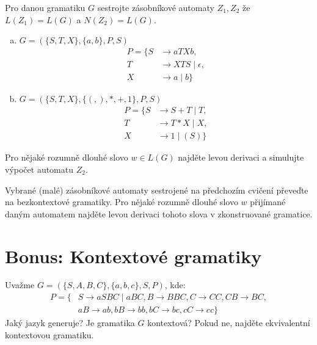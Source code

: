 \documentclass[a4paper,12pt]{amsart}
\begin{document}
\medskip\begin{problem}

    Pro danou gramatiku $G$ sestrojte zásobníkové automaty $Z_1,Z_2$ že $L(Z_1)=L(G)$ a $N(Z_2)=L(G)$.

    \medskip

    \begin{enumerate}[(a)]\setlength\itemsep{6pt}
        \item $G=(\{S,T,X\},\{a,b\},P,S)$
            \begin{align*}
        P=\{S&\rightarrow aTXb, \\
        T&\rightarrow XTS\mid \epsilon,\\ 
        X&\rightarrow a\mid b\}
        \end{align*}
        \item $G=(\{S,T,X\},\{(,),*,+,1\},P,S)$
            \begin{align*}
        P=\{S&\rightarrow S+T\mid T, \\
        T&\rightarrow T*X\mid X,\\ 
        X&\rightarrow 1\mid (S)\}
        \end{align*}
    \end{enumerate}

    Pro nějaké rozumně dlouhé slovo $w\in L(G)$ najděte levou derivaci a simulujte výpočet automatu $Z_2$.

\end{problem}
    

\medskip\begin{problem}

    Vybrané (malé) zásobníkové automaty sestrojené na předchozím cvičení převeďte na bezkontextové gramatiky. Pro nějaké rozumně dlouhé slovo $w$ přijímané daným automatem najděte levou derivaci tohoto slova v zkonstruované gramatice.

\end{problem}


\section*{Bonus: Kontextové gramatiky}


\medskip\begin{problem}
    
    Uvažme $G=(\{S,A,B,C\},\{a,b,c\},S,P)$, kde:
    \begin{align*}
        P=\{&S\rightarrow aSBC\mid aBC, B\rightarrow BBC,  C\rightarrow CC, CB\rightarrow BC,\\ 
        &aB\rightarrow ab, bB\rightarrow bb, bC\rightarrow bc, cC\rightarrow cc\}
    \end{align*}
    Jaký jazyk generuje? Je gramatika $G$ kontextová? Pokud ne, najděte ekvivalentní kontextovou gramatiku.
    
\end{problem}
\end{document}

